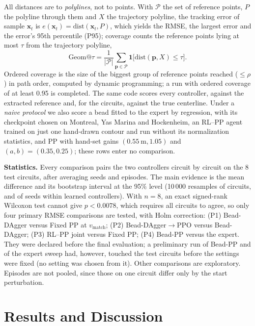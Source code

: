 \documentclass{IJCAS}
\begin{document}
All distances are to \emph{polylines}, not to points. With $\mathcal{P}$ the set of reference points, $P$ the polyline through them and $X$ the trajectory polyline, the tracking error of sample $\mathbf{x}_t$ is $e(\mathbf{x}_t)=\mathrm{dist}(\mathbf{x}_t,P)$, which yields the RMSE, the largest error and the error's 95th percentile (P95); coverage counts the reference points lying at most $\tau$ from the trajectory polyline,
\begin{equation}
\mathrm{Geom@}\tau=\frac{1}{|\mathcal{P}|}\sum_{\mathbf{p}\in\mathcal{P}}\mathbf{1}\big[\mathrm{dist}(\mathbf{p},X)\le\tau\big].\label{eq:geom}
\end{equation}
Ordered coverage is the size of the biggest group of reference points reached ($\le\rho$) in path order, computed by dynamic programming; a run with ordered coverage of at least 0.95 is completed. The same code scores every controller, against the extracted reference and, for the circuits, against the true centerline. Under a \emph{naive protocol} we also score a bead fitted to the expert by regression, with its checkpoint chosen on Montreal, Yas Marina and Hockenheim, an RL--PP agent trained on just one hand-drawn contour and run without its normalization statistics, and PP with hand-set gains $(0.55\ \mathrm{m},1.05)$ and $(a,b)=(0.35,0.25)$; these rows enter no comparison.

\textbf{Statistics.} Every comparison pairs the two controllers circuit by circuit on the 8 test circuits, after averaging seeds and episodes. The main evidence is the mean difference and its bootstrap interval at the 95\% level (10\,000 resamples of circuits, and of seeds within learned controllers). With $n=8$, an exact signed-rank Wilcoxon test cannot give $p<0.0078$, which requires all circuits to agree, so only four primary RMSE comparisons are tested, with Holm correction: (P1) Bead-DAgger versus Fixed PP at $v_{\mathrm{match}}$; (P2) Bead-DAgger$\to$PPO versus Bead-DAgger; (P3) RL--PP joint versus Fixed PP; (P4) Bead-PP versus the expert. They were declared before the final evaluation; a preliminary run of Bead-PP and of the expert sweep had, however, touched the test circuits before the settings were fixed (no setting was chosen from it). Other comparisons are exploratory. Episodes are not pooled, since those on one circuit differ only by the start perturbation.

\section{Results and Discussion}
\end{document}
